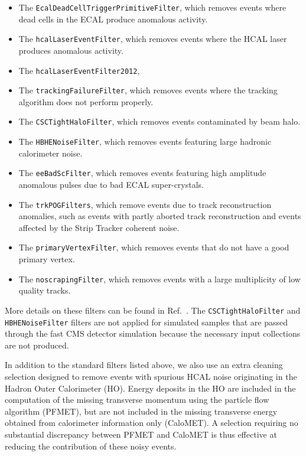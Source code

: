 \begin{itemize}
\item The {\tt EcalDeadCellTriggerPrimitiveFilter}, which removes events where dead cells in the
ECAL produce anomalous activity.
\item The {\tt hcalLaserEventFilter}, which removes events where the HCAL laser produces anomalous
activity.
\item The {\tt hcalLaserEventFilter2012}, 
\item The {\tt trackingFailureFilter}, which removes events where the tracking algorithm does not
perform properly.
\item The {\tt CSCTightHaloFilter}, which removes events contaminated by beam halo.
\item The {\tt HBHENoiseFilter}, which removes events featuring large hadronic calorimeter noise.
\item The {\tt eeBadScFilter}, which removes events featuring high amplitude anomalous pulses due
to bad ECAL super-crystals.
\item The {\tt trkPOGFilters}, which remove events due to track reconstruction anomalies, such as
events with partly aborted track reconstruction and events affected by the Strip Tracker coherent
noise.
\item The {\tt primaryVertexFilter}, which removes events that do not have a good primary vertex.
\item The {\tt noscrapingFilter}, which removes events with a large multiplicity of low quality
tracks.
\end{itemize}

More details on these filters can be found in Ref.~\cite{metfilters}. The {\tt CSCTightHaloFilter}
and {\tt HBHENoiseFilter} filters are not applied for simulated samples that are
passed through the fast CMS detector simulation because the necessary input collections are
not produced.

In addition to the standard filters listed above, we also use an extra cleaning selection designed
to remove events with spurious HCAL noise originating in the Hadron Outer Calorimeter (HO). 
Energy deposits in the HO are included in the computation of the missing transverse momentum using 
the particle flow algorithm (PFMET), but are not included in the missing transverse energy obtained
from calorimeter information only (CaloMET). 
A selection requiring no substantial discrepancy between PFMET and CaloMET is thus effective at
reducing the contribution of these noisy events. 


